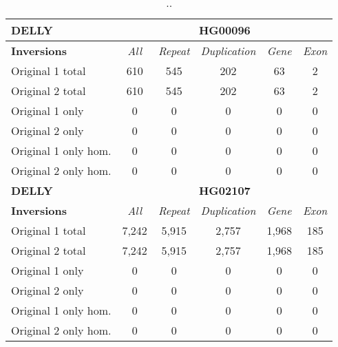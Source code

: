 \begin{table}[htb]
\caption{ .. }
\begin{center}
\begin{tabular}{|l|c||c|c|c|c|}
\hline
{\bf DELLY} & \multicolumn{5}{|c|}{\bf HG00096} \\
\hline
\cline{2-6}
{\bf Inversions} & {\it All} & {\it Repeat} & {\it Duplication} & {\it Gene} & {\it Exon} \\
\hline
Original 1 total & 610 & 545 & 202 & 63 & 2\\ 
\hline
Original 2 total & 610 & 545 & 202 & 63 & 2\\ 
\hline
Original 1 only & 0 & 0 & 0 & 0 & 0\\ 
\hline
Original 2 only & 0 & 0 & 0 & 0 & 0\\ 
\hline
Original 1 only hom. & 0 & 0 & 0 & 0 & 0\\ 
\hline
Original 2 only hom. & 0 & 0 & 0 & 0 & 0\\ 
\hline
\hline
{\bf DELLY} & \multicolumn{5}{|c|}{\bf HG02107} \\
\hline
\cline{2-6}
{\bf Inversions} & {\it All} & {\it Repeat} & {\it Duplication} & {\it Gene} & {\it Exon} \\
\hline
Original 1 total & 7,242 & 5,915 & 2,757 & 1,968 & 185\\ 
\hline
Original 2 total & 7,242 & 5,915 & 2,757 & 1,968 & 185\\ 
\hline
Original 1 only & 0 & 0 & 0 & 0 & 0\\ 
\hline
Original 2 only & 0 & 0 & 0 & 0 & 0\\ 
\hline
Original 1 only hom. & 0 & 0 & 0 & 0 & 0\\ 
\hline
Original 2 only hom. & 0 & 0 & 0 & 0 & 0\\ 
\hline
\end{tabular}
\end{center}
\label{tab:orig-vs-orig2-delly-inv}
\end{table}

